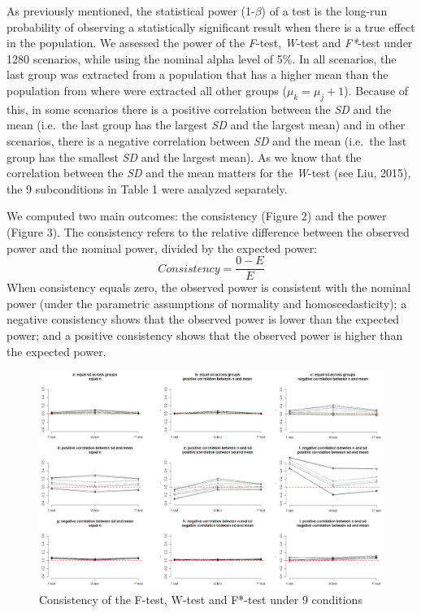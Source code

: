 \documentclass[man,floatsintext]{apa6}
\begin{document}
As previously mentioned, the statistical power (1-\(\beta\)) of a test is the long-run probability of observing a statistically significant result when there is a true effect in the population. We assessed the power of the \emph{F}-test, \emph{W}-test and \emph{F*}-test under 1280 scenarios, while using the nominal alpha level of 5\%. In all scenarios, the last group was extracted from a population that has a higher mean than the population from where were extracted all other groups (\(\mu_k = \mu_j+1\)). Because of this, in some scenarios there is a positive correlation between the \emph{SD} and the mean (i.e.~the last group has the largest \emph{SD} and the largest mean) and in other scenarios, there is a negative correlation between \emph{SD} and the mean (i.e.~the last group has the smallest \emph{SD} and the largest mean). As we know that the correlation between the \emph{SD} and the mean matters for the \emph{W}-test (see Liu, 2015), the 9 subconditions in Table 1 were analyzed separately.

We computed two main outcomes: the consistency (Figure 2) and the power (Figure 3). The consistency refers to the relative difference between the observed power and the nominal power, divided by the expected power:
\begin{equation} 
Consistency=\frac{0-E}{E}
\label{eq:RDPWtest}
\end{equation}
When consistency equals zero, the observed power is consistent with the nominal power (under the parametric assumptions of normality and homoscedasticity); a negative consistency shows that the observed power is lower than the expected power; and a positive consistency shows that the observed power is higher than the expected power.

\begin{figure}
\includegraphics[width=1\linewidth]{Rmarkdown folder/Rmarkdown inputs/Fig2_after revision} \caption{Consistency of the F-test, W-test and F*-test under 9 conditions}\label{fig:unnamed-chunk-2}
\end{figure}
\end{document}
